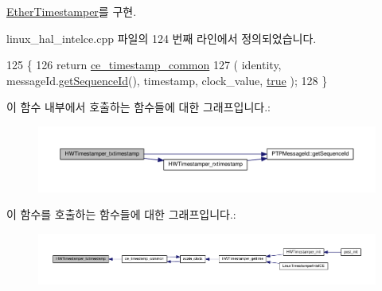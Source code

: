 \hyperlink{class_ether_timestamper_a82619058d136ce4314189f1c9db91914}{Ether\+Timestamper}를 구현.



linux\+\_\+hal\+\_\+intelce.\+cpp 파일의 124 번째 라인에서 정의되었습니다.


\begin{DoxyCode}
125                                      \{
126     \textcolor{keywordflow}{return} \hyperlink{class_linux_timestamper_intel_c_e_aea6548c8f8bdc0cf5c5c1a2a56e14212}{ce\_timestamp\_common}
127         ( identity, messageId.\hyperlink{class_p_t_p_message_id_abd5cac5701120cbbfc56129b31fa801f}{getSequenceId}(), timestamp, clock\_value, 
      \hyperlink{avb__gptp_8h_af6a258d8f3ee5206d682d799316314b1a08f175a5505a10b9ed657defeb050e4b}{true} );
128 \}
\end{DoxyCode}


이 함수 내부에서 호출하는 함수들에 대한 그래프입니다.\+:
\nopagebreak
\begin{figure}[H]
\begin{center}
\leavevmode
\includegraphics[width=350pt]{class_linux_timestamper_intel_c_e_a8ca092c3a907618eebf1d512de28db18_cgraph}
\end{center}
\end{figure}




이 함수를 호출하는 함수들에 대한 그래프입니다.\+:
\nopagebreak
\begin{figure}[H]
\begin{center}
\leavevmode
\includegraphics[width=350pt]{class_linux_timestamper_intel_c_e_a8ca092c3a907618eebf1d512de28db18_icgraph}
\end{center}
\end{figure}


